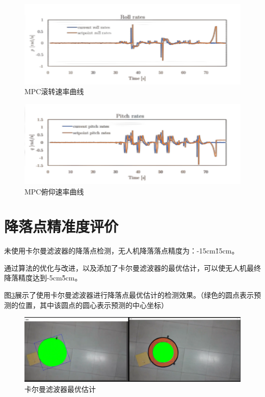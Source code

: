 \begin{figure}[ht]
  \centering
  \includegraphics[width=0.8\linewidth]{./Figure/MPC-Roll-Rates.png}
  \caption{MPC滚转速率曲线}\label{Fig:img17}
\end{figure}

\begin{figure}[ht]
  \centering
  \includegraphics[width=0.8\linewidth]{./Figure/MPC-Pitch-Rates.png}
  \caption{MPC俯仰速率曲线}\label{Fig:img18}
\end{figure}

\section{降落点精准度评价}

未使用卡尔曼滤波器的降落点检测，无人机降落落点精度为：-15cm\~15cm。

通过算法的优化与改进，以及添加了卡尔曼滤波器的最优估计，可以使无人机最终降落精度达到-5cm\~5cm。

图\ref{Fig:img19}展示了使用卡尔曼滤波器进行降落点最优估计的检测效果。（绿色的圆点表示预测的位置，其中该圆点的圆心表示预测的中心坐标）

\begin{figure}[ht]
  \centering
  \includegraphics[width=0.8\linewidth]{./Figure/Kalman_Prediction.png}
  \caption{卡尔曼滤波器最优估计}\label{Fig:img19}
\end{figure}

